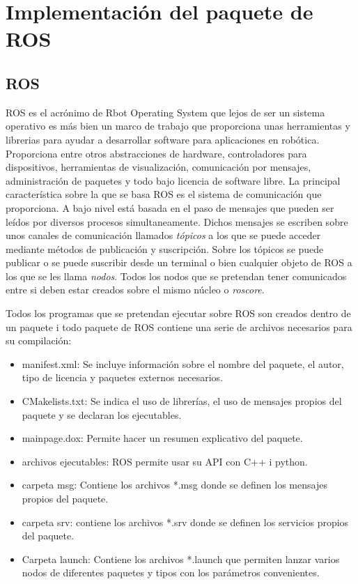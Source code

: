 \documentclass[12pt,a4paper,final,twoside]{article}
\begin{document}
\newpage
\section{Implementación del paquete de ROS}
\subsection{ROS}
\label{ros}
ROS es el acrónimo de Rbot Operating System que lejos de ser un sistema operativo es más bien un marco de trabajo que proporciona unas herramientas y librerias para ayudar a desarrollar software para aplicaciones en robótica. Proporciona entre otros abstracciones de hardware, controladores para dispositivos, herramientas de visualización, comunicación por mensajes, administración de paquetes y todo bajo licencia de software libre.
La principal característica sobre la que se basa ROS es el sistema de comunicación que proporciona. A bajo nivel está basada en el paso de mensajes que pueden ser leídos por diversos procesos simultaneamente. Dichos mensajes se escriben sobre unos canales de comunicación llamados \textit{tópicos} a los que se puede acceder mediante métodos de publicación y suscripción. Sobre los tópicos se puede publicar o se puede suscribir desde un terminal o bien cualquier objeto de ROS a los que se les llama \textit{nodos}. Todos los nodos que se pretendan tener comunicados entre si deben estar creados sobre el mismo núcleo o \textit{roscore}.


Todos los programas que se pretendan ejecutar sobre ROS son creados dentro de un paquete i todo paquete de ROS contiene una serie de archivos necesarios para su compilación:
\begin{itemize}
\item manifest.xml: Se incluye información sobre el nombre del paquete, el autor, tipo de licencia y paquetes externos necesarios.
\item CMakelists.txt: Se indica el uso de librerías, el uso de mensajes propios del paquete y se declaran los ejecutables.
\item mainpage.dox: Permite hacer un resumen explicativo del paquete.
\item archivos ejecutables: ROS permite usar su API con C++ i python.
\item carpeta msg: Contiene los archivos *.msg donde se definen los mensajes propios del paquete.
\item carpeta srv: contiene los archivos *.srv donde se definen los servicios propios del paquete.
\item Carpeta launch: Contiene los archivos *.launch que permiten lanzar varios nodos de diferentes paquetes y tipos con los parámetros convenientes.

\end{itemize}
\end{document}
